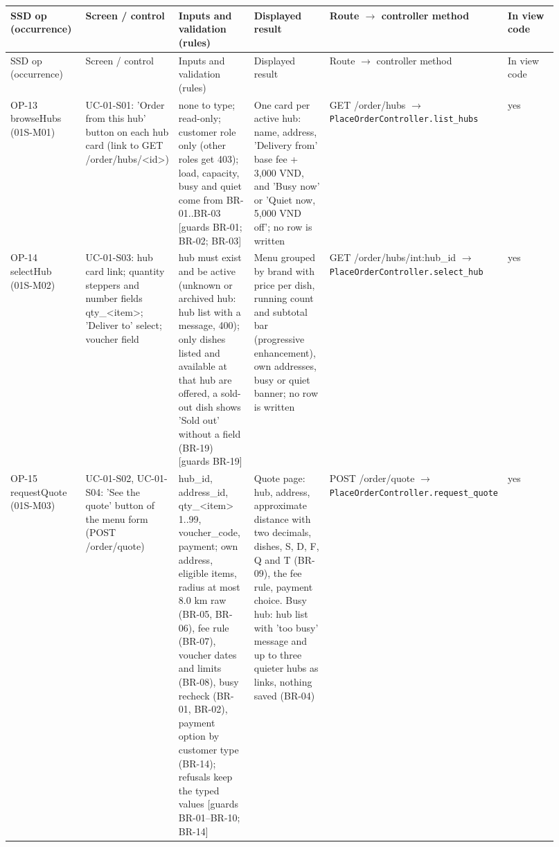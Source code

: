 \begingroup\footnotesize
\begin{longtable}{>{\raggedright\arraybackslash}p{0.1533\linewidth}>{\raggedright\arraybackslash}p{0.1533\linewidth}>{\raggedright\arraybackslash}p{0.1533\linewidth}>{\raggedright\arraybackslash}p{0.1533\linewidth}>{\raggedright\arraybackslash}p{0.1533\linewidth}>{\raggedright\arraybackslash}p{0.1533\linewidth}}
SSD op (occurrence) & Screen / control & Inputs and validation (rules) & Displayed result & Route \ensuremath{\rightarrow} controller method & In view code \\
\hline\endfirsthead
SSD op (occurrence) & Screen / control & Inputs and validation (rules) & Displayed result & Route \ensuremath{\rightarrow} controller method & In view code \\
\hline\endhead
OP-13 browseHubs (01S-M01) & UC-01-S01: 'Order from this hub' button on each hub card (link to GET /order/hubs/\textless{}id\textgreater{}) & none to type; read-only; customer role only (other roles get 403); load, capacity, busy and quiet come from BR-01..BR-03 [guards BR-01; BR-02; BR-03] & One card per active hub: name, address, 'Delivery from' base fee + 3,000 VND, and 'Busy now' or 'Quiet now, 5,000 VND off'; no row is written & GET /order/hubs \ensuremath{\rightarrow} \texttt{PlaceOrderController.\allowbreak{}list\_\allowbreak{}hubs} & yes \\
OP-14 selectHub (01S-M02) & UC-01-S03: hub card link; quantity steppers and number fields qty\_\textless{}item\textgreater{}; 'Deliver to' select; voucher field & hub must exist and be active (unknown or archived hub: hub list with a message, 400); only dishes listed and available at that hub are offered, a sold-out dish shows 'Sold out' without a field (BR-19) [guards BR-19] & Menu grouped by brand with price per dish, running count and subtotal bar (progressive enhancement), own addresses, busy or quiet banner; no row is written & GET /order/hubs/int:hub\_id \ensuremath{\rightarrow} \texttt{PlaceOrderController.\allowbreak{}select\_\allowbreak{}hub} & yes \\
OP-15 requestQuote (01S-M03) & UC-01-S02, UC-01-S04: 'See the quote' button of the menu form (POST /order/quote) & hub\_id, address\_id, qty\_\textless{}item\textgreater{} 1..99, voucher\_code, payment; own address, eligible items, radius at most 8.0 km raw (BR-05, BR-06), fee rule (BR-07), voucher dates and limits (BR-08), busy recheck (BR-01, BR-02), payment option by customer type (BR-14); refusals keep the typed values [guards BR-01--BR-10; BR-14] & Quote page: hub, address, approximate distance with two decimals, dishes, S, D, F, Q and T (BR-09), the fee rule, payment choice. Busy hub: hub list with 'too busy' message and up to three quieter hubs as links, nothing saved (BR-04) & POST /order/quote \ensuremath{\rightarrow} \texttt{PlaceOrderController.\allowbreak{}request\_\allowbreak{}quote} & yes \\

\end{longtable}
